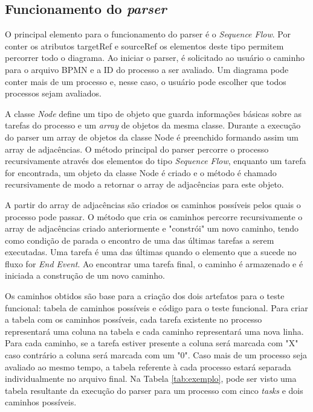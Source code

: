 \documentclass[12pt]{article}
\begin{document}

\subsection{Funcionamento do \emph{parser}}
O principal elemento para o funcionamento do parser é o \emph{Sequence Flow}. Por conter os atributos targetRef e sourceRef os elementos deste tipo permitem percorrer todo o diagrama. Ao iniciar o parser, é solicitado ao usuário o caminho para o arquivo BPMN e a ID do processo a ser avaliado. Um diagrama pode conter mais de um processo e, nesse caso, o usuário pode escolher que todos processos sejam avaliados.

A classe \emph{Node} define um tipo de objeto que guarda informações básicas sobre as tarefas do processo e um \emph{array} de objetos da mesma classe. Durante a execução do parser um array de objetos da classe Node é preenchido formando assim um array de adjacências. O método principal do parser percorre o processo recursivamente através dos elementos do tipo \emph{Sequence Flow}, enquanto um tarefa for encontrada, um objeto da classe Node é criado e o método é chamado recursivamente de modo a retornar o array de adjacências para este objeto.

A partir do array de adjacências são criados os caminhos possíveis pelos quais o processo pode passar. O método que cria os caminhos percorre recursivamente o array de adjacências criado anteriormente e "constrói" um novo caminho, tendo como condição de parada o encontro de uma das últimas tarefas a serem executadas. Uma tarefa é uma das últimas quando o elemento que a sucede no fluxo for \emph{End Event}. Ao encontrar uma tarefa final, o caminho é armazenado e é iniciada a construção de um novo caminho.

Os caminhos obtidos são base para a criação dos dois artefatos para o teste funcional: tabela de caminhos possíveis e código para o teste funcional. Para criar a tabela com os caminhos possíveis, cada tarefa existente no processo representará uma coluna na tabela e cada caminho representará uma nova linha. Para cada caminho, se a tarefa estiver presente a coluna será marcada com "X" caso contrário a coluna será marcada com um "0". Caso mais de um processo seja avaliado ao mesmo tempo, a tabela referente à cada processo estará separada individualmente no arquivo final. Na Tabela \ref{tab:exemplo}, pode ser visto uma tabela resultante da execução do parser para um processo com cinco \emph{tasks} e dois caminhos possíveis. 
\end{document}

